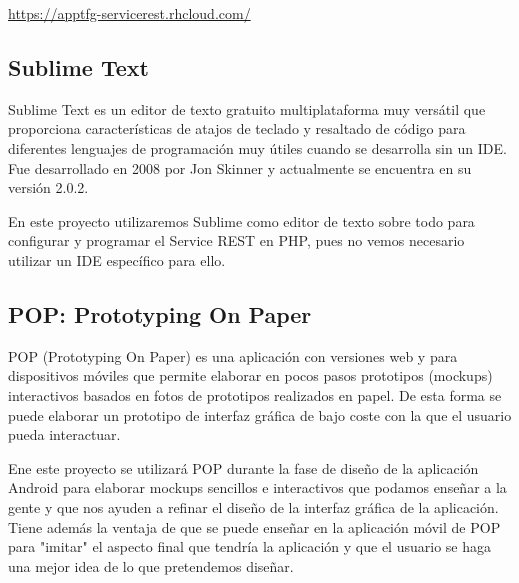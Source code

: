 	\url{https://apptfg-servicerest.rhcloud.com/}    
    
    \subsection{Sublime Text}\label{ssec:sublime}
    
    Sublime Text \cite{ref:sublime} es un editor de texto gratuito multiplataforma muy versátil que proporciona características de atajos de teclado y resaltado de código para diferentes lenguajes de programación muy útiles cuando se desarrolla sin un IDE. Fue desarrollado en 2008 por Jon Skinner y actualmente se encuentra en su versión 2.0.2.
    
    En este proyecto utilizaremos Sublime como editor de texto sobre todo para configurar y programar el Service REST en PHP, pues no vemos necesario utilizar un IDE específico para ello.
    
    \subsection{POP: Prototyping On Paper}\label{ssec:pop}
    
    POP \cite{ref:pop} (Prototyping On Paper) es una aplicación con versiones web y para dispositivos móviles que permite elaborar en pocos pasos prototipos (mockups) interactivos basados en fotos de prototipos realizados en papel. De esta forma se puede elaborar un prototipo de interfaz gráfica de bajo coste con la que el usuario pueda interactuar.
    
    Ene este proyecto se utilizará POP durante la fase de diseño de la aplicación Android para elaborar mockups sencillos e interactivos que podamos enseñar a la gente y que nos ayuden a refinar el diseño de la interfaz gráfica de la aplicación. Tiene además la ventaja de que se puede enseñar en la aplicación móvil de POP para "imitar" el aspecto final que tendría la aplicación y que el usuario se haga una mejor idea de lo que pretendemos diseñar.
    